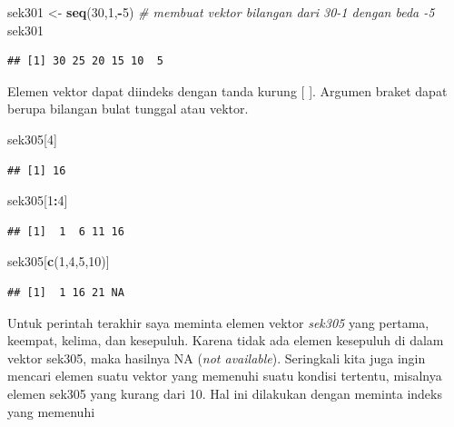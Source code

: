 \documentclass[a4paper, nobind]{templates/ociamthesis}
\newenvironment{Shaded}{\begin{snugshade}}{\end{snugshade}}
\newcommand{\CommentTok}[1]{\textcolor[rgb]{0.56,0.35,0.01}{\textit{#1}}}
\newcommand{\DecValTok}[1]{\textcolor[rgb]{0.00,0.00,0.81}{#1}}
\newcommand{\FunctionTok}[1]{\textcolor[rgb]{0.13,0.29,0.53}{\textbf{#1}}}
\newcommand{\NormalTok}[1]{#1}
\newcommand{\OtherTok}[1]{\textcolor[rgb]{0.56,0.35,0.01}{#1}}
\newcommand{\SpecialCharTok}[1]{\textcolor[rgb]{0.81,0.36,0.00}{\textbf{#1}}}
\renewenvironment{Shaded}
{
  \vspace{10pt}%
  \begin{snugshade}%
}{%
  \end{snugshade}%
  \vspace{8pt}%
}
\begin{document}
\begin{Shaded}
\begin{Highlighting}[]
\NormalTok{sek301 }\OtherTok{\textless{}{-}} \FunctionTok{seq}\NormalTok{(}\DecValTok{30}\NormalTok{,}\DecValTok{1}\NormalTok{,}\SpecialCharTok{{-}}\DecValTok{5}\NormalTok{) }\CommentTok{\# membuat vektor bilangan dari 30{-}1 dengan beda {-}5}
\NormalTok{sek301}
\end{Highlighting}
\end{Shaded}

\begin{verbatim}
## [1] 30 25 20 15 10  5
\end{verbatim}

Elemen vektor dapat diindeks dengan tanda kurung {[} {]}. Argumen braket dapat berupa bilangan bulat tunggal atau vektor.

\begin{Shaded}
\begin{Highlighting}[]
\NormalTok{sek305[}\DecValTok{4}\NormalTok{]}
\end{Highlighting}
\end{Shaded}

\begin{verbatim}
## [1] 16
\end{verbatim}

\begin{Shaded}
\begin{Highlighting}[]
\NormalTok{sek305[}\DecValTok{1}\SpecialCharTok{:}\DecValTok{4}\NormalTok{]}
\end{Highlighting}
\end{Shaded}

\begin{verbatim}
## [1]  1  6 11 16
\end{verbatim}

\begin{Shaded}
\begin{Highlighting}[]
\NormalTok{sek305[}\FunctionTok{c}\NormalTok{(}\DecValTok{1}\NormalTok{,}\DecValTok{4}\NormalTok{,}\DecValTok{5}\NormalTok{,}\DecValTok{10}\NormalTok{)]}
\end{Highlighting}
\end{Shaded}

\begin{verbatim}
## [1]  1 16 21 NA
\end{verbatim}

Untuk perintah terakhir saya meminta elemen vektor \emph{sek305} yang pertama, keempat, kelima, dan kesepuluh. Karena tidak ada elemen kesepuluh di dalam vektor sek305, maka hasilnya NA (\emph{not available}). Seringkali kita juga ingin mencari elemen suatu vektor yang memenuhi suatu kondisi tertentu, misalnya elemen sek305 yang kurang dari 10. Hal ini dilakukan dengan meminta indeks yang memenuhi
\end{document}
